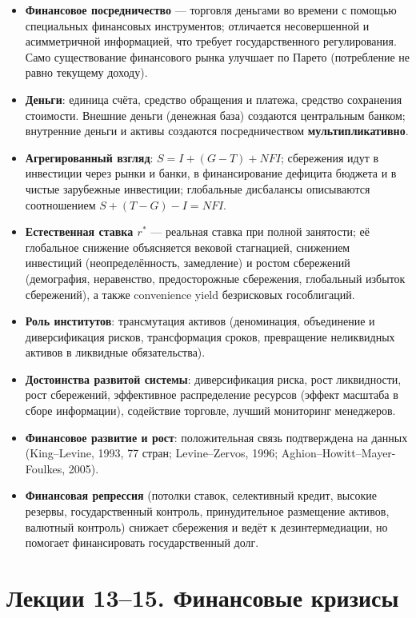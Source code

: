 \documentclass[10pt,a4paper]{article}
\begin{document}
\begin{itemize}[leftmargin=1.3em]
\item \textbf{Финансовое посредничество} — торговля деньгами во времени с помощью специальных финансовых инструментов; отличается несовершенной и асимметричной информацией, что требует государственного регулирования. Само существование финансового рынка улучшает по Парето (потребление не равно текущему доходу).
\item \textbf{Деньги}: единица счёта, средство обращения и платежа, средство сохранения стоимости. Внешние деньги (денежная база) создаются центральным банком; внутренние деньги и активы создаются посредничеством \textbf{мультипликативно}.
\item \textbf{Агрегированный взгляд}: $S=I+(G-T)+NFI$; сбережения идут в инвестиции через рынки и банки, в финансирование дефицита бюджета и в чистые зарубежные инвестиции; глобальные дисбалансы описываются соотношением $S+(T-G)-I=NFI$.
\item \textbf{Естественная ставка $r^{*}$} — реальная ставка при полной занятости; её глобальное снижение объясняется вековой стагнацией, снижением инвестиций (неопределённость, замедление) и ростом сбережений (демография, неравенство, предосторожные сбережения, глобальный избыток сбережений), а также convenience yield безрисковых гособлигаций.
\item \textbf{Роль институтов}: трансмутация активов (деноминация, объединение и диверсификация рисков, трансформация сроков, превращение неликвидных активов в ликвидные обязательства).
\item \textbf{Достоинства развитой системы}: диверсификация риска, рост ликвидности, рост сбережений, эффективное распределение ресурсов (эффект масштаба в сборе информации), содействие торговле, лучший мониторинг менеджеров.
\item \textbf{Финансовое развитие и рост}: положительная связь подтверждена на данных (King--Levine, 1993, 77 стран; Levine--Zervos, 1996; Aghion--Howitt--Mayer-Foulkes, 2005).
\item \textbf{Финансовая репрессия} (потолки ставок, селективный кредит, высокие резервы, государственный контроль, принудительное размещение активов, валютный контроль) снижает сбережения и ведёт к дезинтермедиации, но помогает финансировать государственный долг.
\end{itemize}

\newpage
\section{Лекции 13--15. Финансовые кризисы}
\end{document}
